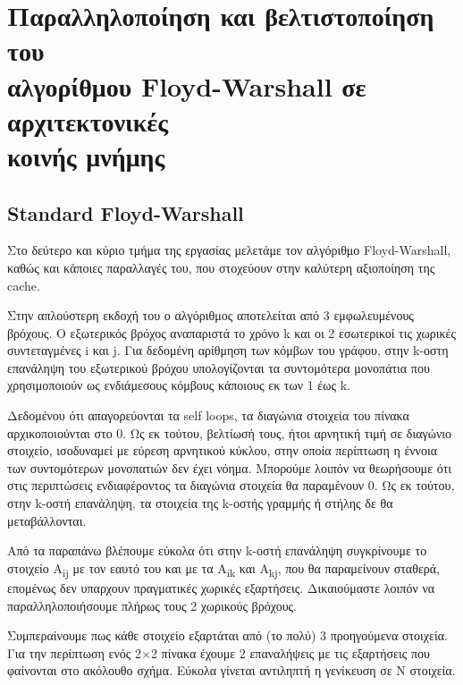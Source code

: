 \documentclass[12pt,titlepage]{article}
\begin{document}
\newpage

\section{Παραλληλοποίηση και βελτιστοποίηση του\\ αλγορίθμου Floyd-Warshall σε αρχιτεκτονικές\\ κοινής μνήμης}

\subsection{Standard Floyd-Warshall}

Στο δεύτερο και κύριο τμήμα της εργασίας μελετάμε τον αλγόριθμο Floyd-Warshall,
καθώς και κάποιες παραλλαγές του, που στοχεύουν στην καλύτερη αξιοποίηση της
cache.

Στην απλούστερη εκδοχή του ο αλγόριθμος αποτελείται από 3 εμφωλευμένους βρόχους.
Ο εξωτερικός βρόχος αναπαριστά το χρόνο k και οι 2 εσωτερικοί τις χωρικές
συντεταγμένες i και j. Για δεδομένη αρίθμηση των κόμβων του γράφου, στην k-οστη
επανάληψη του εξωτερικού βρόχου υπολογίζονται τα συντομότερα μονοπάτια που
χρησιμοποιούν ως ενδιάμεσους κόμβους κάποιους εκ των 1 έως k.

Δεδομένου ότι απαγορεύονται τα self loops, τα διαγώνια στοιχεία του πίνακα
αρχικοποιούνται στο 0. Ως εκ τούτου, βελτίωσή τους, ήτοι αρνητική τιμή σε
διαγώνιο στοιχείο, ισοδυναμεί με εύρεση αρνητικού κύκλου, στην οποία περίπτωση η
έννοια των συντομότερων μονοπατιών δεν έχει νόημα. Μπορούμε λοιπόν να θεωρήσουμε
ότι στις περιπτώσεις ενδιαφέροντος τα διαγώνια στοιχεία θα παραμένουν 0. Ως εκ
τούτου, στην k-οστή επανάληψη, τα στοιχεία της k-οστής γραμμής ή στήλης δε θα
μεταβάλλονται.

Από τα παραπάνω βλέπουμε εύκολα ότι στην k-οστή επανάληψη συγκρίνουμε το
στοιχείο A\textsubscript{ij} με τον εαυτό του και με τα A\textsubscript{ik}
και A\textsubscript{kj}, που θα παραμείνουν σταθερά, επομένως δεν υπαρχουν
πραγματικές χωρικές εξαρτήσεις. Δικαιούμαστε λοιπόν να παραλληλοποιήσουμε πλήρως
τους 2 χωρικούς βρόχους.

Συμπεραίνουμε πως κάθε στοιχείο εξαρτάται από (το πολύ) 3 προηγούμενα στοιχεία.
Για την περίπτωση ενός 2$\times$2 πίνακα έχουμε 2 επαναλήψεις με τις εξαρτήσεις
που φαίνονται στο ακόλουθο σχήμα. Εύκολα γίνεται αντιληπτή η γενίκευση σε N
στοιχεία.

\begin{center}
\end{center}
\end{document}
